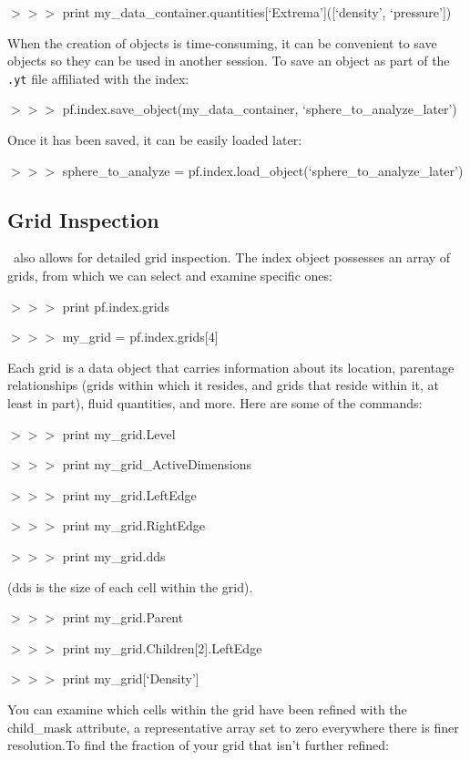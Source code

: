 {\scriptsize$>>>$} print my\_data\_container.quantities[`Extrema']([`density', `pressure'])

When the creation of objects is time-consuming, it can be convenient
to save objects so they can be used in another session. To save an
object as part of the {\tt .yt} file affiliated with the index:

{\scriptsize$>>>$} pf.index.save\_object(my\_data\_container, `sphere\_to\_analyze\_later')

Once it has been saved, it can be easily loaded later:

{\scriptsize$>>>$} sphere\_to\_analyze = pf.index.load\_object(`sphere\_to\_analyze\_later')

\subsection{Grid Inspection}

\yt\ also allows for detailed grid inspection. The index object
possesses an array of grids, from which we can select and examine
specific ones:

{\scriptsize$>>>$} print pf.index.grids

{\scriptsize$>>>$} my\_grid = pf.index.grids[4]

Each grid is a data object that carries information about its
location, parentage relationships (grids within which it resides, and
grids that reside within it, at least in part), fluid quantities, and
more. Here are some of the commands:

{\scriptsize$>>>$} print my\_grid.Level

{\scriptsize$>>>$} print my\_grid\_ActiveDimensions

{\scriptsize$>>>$} print my\_grid.LeftEdge

{\scriptsize$>>>$} print my\_grid.RightEdge

{\scriptsize$>>>$} print my\_grid.dds

(dds is the size of each cell within the grid).

{\scriptsize$>>>$} print my\_grid.Parent

{\scriptsize$>>>$} print my\_grid.Children[2].LeftEdge

{\scriptsize$>>>$} print my\_grid[`Density']

You can examine which cells within the grid have been refined with the
child\_mask attribute, a representative array set to zero everywhere
there is finer resolution.To find the fraction of your grid that isn't
further refined:

